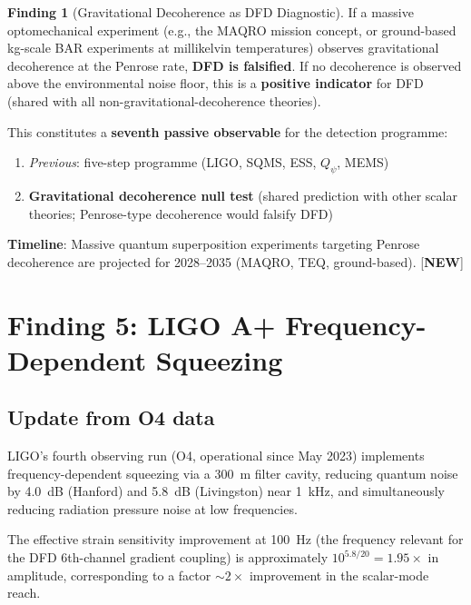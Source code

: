 \documentclass[11pt]{article}
\newcommand{\Qpsi}{Q_\psi}
\theoremstyle{definition}
\newtheorem{finding}[theorem]{Finding}
\theoremstyle{remark}
\begin{document}
\begin{finding}[Gravitational Decoherence as DFD Diagnostic]
\label{find:decoherence}
If a massive optomechanical experiment (e.g., the MAQRO mission concept,
or ground-based kg-scale BAR experiments at millikelvin temperatures)
observes gravitational decoherence at the Penrose rate, \textbf{DFD is
falsified}. If no decoherence is observed above the environmental noise
floor, this is a \textbf{positive indicator} for DFD (shared with all
non-gravitational-decoherence theories).

This constitutes a \textbf{seventh passive observable} for the
detection programme:
\begin{enumerate}[nosep]
\item[(6)] \emph{Previous}: five-step programme (LIGO, SQMS, ESS, $\Qpsi$, MEMS)
\item[(7)] \textbf{Gravitational decoherence null test} (shared
  prediction with other scalar theories; Penrose-type decoherence
  would falsify DFD)
\end{enumerate}

\textbf{Timeline}: Massive quantum superposition experiments targeting
Penrose decoherence are projected for 2028--2035 (MAQRO, TEQ, ground-based).
[\textbf{NEW}]
\end{finding}


\section{Finding 5: LIGO A+ Frequency-Dependent Squeezing}
\label{sec:ligo_squeezing}

\subsection{Update from O4 data}

LIGO's fourth observing run (O4, operational since May 2023) implements
frequency-dependent squeezing via a 300~m filter cavity, reducing
quantum noise by 4.0~dB (Hanford) and 5.8~dB (Livingston) near 1~kHz,
and simultaneously reducing radiation pressure noise at low frequencies.

The effective strain sensitivity improvement at 100~Hz (the frequency
relevant for the DFD 6th-channel gradient coupling) is approximately
$10^{5.8/20} = 1.95\times$ in amplitude, corresponding to a factor
$\sim 2\times$ improvement in the scalar-mode reach.
\end{document}
